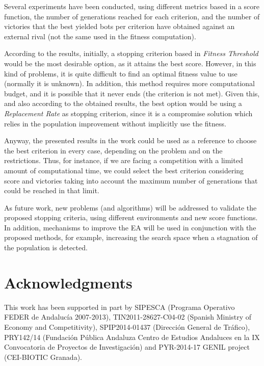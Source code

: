 \documentclass[runningheads,a4paper]{llncs}
\begin{document}
Several experiments have been conducted, using different metrics based in a score function, the number of generations reached for each criterion, and the number of victories that the best yielded bots per criterion have obtained against an external rival (not the same used in the fitness computation).

According to the results, initially, a stopping criterion based in \textit{Fitness Threshold} would be the most desirable option, as it attains the best score. However, in this kind of problems, it is quite difficult to find an optimal fitness value to use (normally it is unknown). In addition, this method requires more computational budget, and it is possible that it never ends (the criterion is not met). Given this, and also according to the obtained results, the best option would be using a \textit{Replacement Rate} as stopping criterion, since it is a compromise solution which relies in the population improvement without implicitly use the fitness.

Anyway, the presented results in the work could be used as a reference to choose the best criterion in every case, depending on the problem and on the restrictions. Thus, for instance, if we are facing a competition with a limited amount of computational time, we could select the best criterion considering score and victories taking into account the maximum number of generations that could be reached in that limit.

As future work, new problems (and algorithms) will be addressed to validate the proposed stopping criteria, using different environments and new score functions. In addition,  mechanisms to improve the EA will be used in conjunction with the proposed methods, for example, increasing the search space when a stagnation of the population is detected.


\section*{Acknowledgments}
This work has been supported in part by SIPESCA (Programa Operativo FEDER de Andaluc\'ia 2007-2013), TIN2011-28627-C04-02 (Spanish Ministry of Economy and Competitivity), SPIP2014-01437 (Direcci\'on General de Tr\'afico), PRY142/14 (Fundaci\'on P\'ublica Andaluza Centro de Estudios Andaluces en la IX Convocatoria de Proyectos de Investigaci\'on) and PYR-2014-17 GENIL project (CEI-BIOTIC Granada).


%





\end{document}
